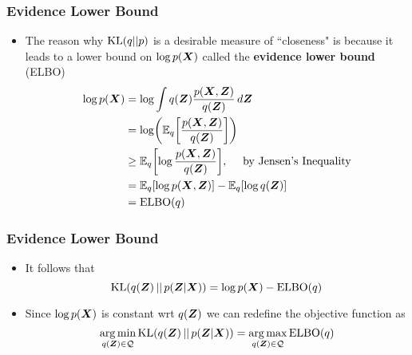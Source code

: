 \documentclass[10pt, compress, notheorems, aspectratio=169]{beamer}
\let\originalleft\left
\let\originalright\right
\renewcommand{\left}{\mathopen{}\mathclose \bgroup \originalleft}
\renewcommand{\right}{\aftergroup \egroup \originalright}
\newcommand{\E}{\mathbb{E}}
\DeclareMathOperator*{\argmax}{arg\,max}
\DeclareMathOperator*{\argmin}{arg\,min}
\begin{document}
\begin{frame}
	\frametitle{Evidence Lower Bound}
	\begin{itemize}
		\item The reason why $\text{KL} \left( q || p \right)$ is a desirable measure of ``closeness" is because it leads to a lower bound on $\log p \left( {\bm X} \right)$ called the \textbf{evidence lower bound} (ELBO)
			\begin{align*}
				\log p \left( {\bm X} \right) 
				&= \log \int q \left( {\bm Z} \right) \frac{p \left( {\bm X}, {\bm Z} \right)}{q \left( {\bm Z} \right)} \, d {\bm Z} \\
				&= \log \left( \E_q \left[ \frac{p \left( {\bm X}, {\bm Z} \right)}{q \left( {\bm Z} \right)} \right] \right) \\
				&\geq \E_q \left[ \log \frac{p \left( {\bm X}, {\bm Z} \right)}{q \left( {\bm Z} \right)} \right], \quad \text{ by Jensen's Inequality} \\
				&= \E_q \left[ \log p \left( {\bm X}, {\bm Z} \right) \right] - \E_q \left[ \log q \left( {\bm Z} \right) \right] \\
				&= \text{ELBO} \left( q \right)
			\end{align*}
	\end{itemize}
\end{frame}

\begin{frame}
	\frametitle{Evidence Lower Bound}
	\begin{itemize}
		\item It follows that 
			\begin{equation*}
				\text{KL} \left( q \left( {\bm Z} \right) \, || \, p \left( {\bm Z} | {\bm X} \right) \right) = \log p \left( {\bm X} \right) - \text{ELBO} \left( q \right)
			\end{equation*}
		\item Since $\log p \left( {\bm X} \right)$ is constant wrt $q \left( {\bm Z} \right)$ we can redefine the objective function as
			\begin{equation*}
				\argmin_{q \left( {\bm Z} \right) \in \mathcal Q} \text{KL} \left( q \left( {\bm Z} \right) \, || \, p \left( {\bm Z} | {\bm X} \right) \right) = \argmax_{q \left( {\bm Z} \right) \in \mathcal Q} \text{ELBO} \left( q \right) 
			\end{equation*}
	\end{itemize}
\end{frame}
\end{document}

